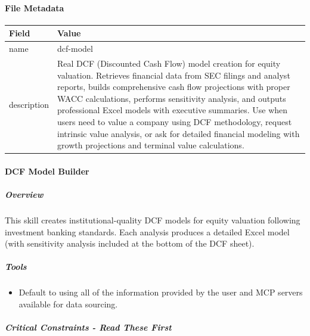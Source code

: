 \documentclass[11pt]{article}
\begin{document}
\paragraph{File Metadata}\mbox{}\par
\begingroup
\small
\setlength{\tabcolsep}{2pt}
\begin{longtable}{>{\RaggedRight\arraybackslash\hspace{0pt}}p{}>{\RaggedRight\arraybackslash\hspace{0pt}}p{}}
\toprule
{} \textbf{Field} & \textbf{Value} \\
\midrule
{} name & dcf-model \\
{} description & Real DCF (Discounted Cash Flow) model creation for equity valuation. Retrieves financial data from SEC filings and analyst reports, builds comprehensive cash flow projections with proper WACC calculations, performs sensitivity analysis, and outputs professional Excel models with executive summaries. Use when users need to value a company using DCF methodology, request intrinsic value analysis, or ask for detailed financial modeling with growth projections and terminal value calculations. \\
\bottomrule
\end{longtable}
\endgroup


\paragraph{DCF Model Builder}\mbox{}\par

\subparagraph{Overview}\mbox{}\par

This skill creates institutional-quality DCF models for equity valuation following investment banking standards. Each analysis produces a detailed Excel model (with sensitivity analysis included at the bottom of the DCF sheet).


\subparagraph{Tools}\mbox{}\par

\begin{itemize}[leftmargin=*,itemsep=2pt,topsep=2pt]
\item {} Default to using all of the information provided by the user and MCP servers available for data sourcing.
\end{itemize}

\subparagraph{Critical Constraints - Read These First}\mbox{}\par
\end{document}
